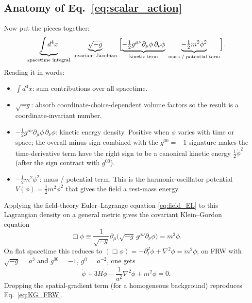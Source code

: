 \documentclass[12pt]{article}
\begin{document}
\subsection{Anatomy of Eq.~\eqref{eq:scalar_action}}
\label{app:action_anatomy}

Now put the pieces together:
%
\begin{equation*}
  \underbrace{\int d^4x}_{\text{spacetime integral}}
  \;
  \underbrace{\sqrt{-g}}_{\text{invariant Jacobian}}
  \;\Bigl[
  \underbrace{-\tfrac{1}{2}g^{\mu\nu}\partial_\mu\phi\,\partial_\nu\phi}_{\text{kinetic term}}
  \;
  \underbrace{-\tfrac{1}{2}m^2\phi^2}_{\text{mass / potential term}}
  \Bigr].
\end{equation*}
%
Reading it in words:
%
\begin{itemize}
  \item $\int d^4x$: sum contributions over all spacetime.
  \item $\sqrt{-g}$: absorb coordinate-choice-dependent volume factors
        so the result is a coordinate-invariant number.
  \item $-\tfrac{1}{2}g^{\mu\nu}\partial_\mu\phi\,\partial_\nu\phi$:
        kinetic energy density.  Positive when $\phi$ varies with
        time or space; the overall minus sign combined with the
        $g^{00}=-1$ signature makes the time-derivative term have
        the right sign to be a canonical kinetic energy
        $\tfrac{1}{2}\dot\phi^2$ (after the sign contract with
        $g^{00}$).
  \item $-\tfrac{1}{2}m^2\phi^2$: mass / potential term.  This is
        the harmonic-oscillator potential $V(\phi) = \tfrac{1}{2}m^2\phi^2$
        that gives the field a rest-mass energy.
\end{itemize}

Applying the field-theory Euler--Lagrange equation \eqref{eq:field_EL}
to this Lagrangian density on a general metric gives the covariant
Klein--Gordon equation
%
\begin{equation}
  \Box\phi \equiv \frac{1}{\sqrt{-g}}\partial_\mu\!\bigl(\sqrt{-g}\,g^{\mu\nu}\partial_\nu\phi\bigr)
    = m^2\phi.
  \label{eq:KG_covariant}
\end{equation}
%
On flat spacetime this reduces to $(\Box\phi) = -\partial_t^2\phi +
\nabla^2\phi = m^2\phi$; on FRW with $\sqrt{-g}=a^3$ and $g^{00}=-1$,
$g^{ii}=a^{-2}$, one gets
%
\begin{equation}
  \ddot\phi + 3H\dot\phi - \frac{1}{a^2}\nabla^2\phi + m^2\phi = 0.
\end{equation}
%
Dropping the spatial-gradient term (for a homogeneous background)
reproduces Eq.~\eqref{eq:KG_FRW}.
\end{document}
